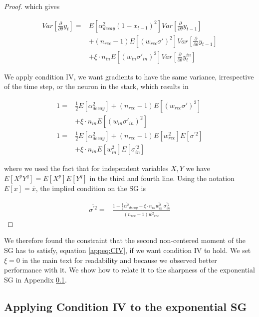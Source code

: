\begin{proof}
\noindent which gives


\begin{align}
    Var[\frac{\partial}{\partial \theta}y_t] =& E[\alpha_{decay}^2(1-x_{t-1})^2] Var[\frac{\partial}{\partial \theta}y_{t-1}] \nonumber \\&+ (n_{rec}-1)E[(w_{rec}\sigma')^2]Var[\frac{\partial}{\partial \theta}y_{t-1}] \nonumber \\&+ \xi \cdot n_{in}E[(w_{in}\sigma'_{in})^2]Var[\frac{\partial}{\partial \theta}y_{t}^{in}]
\end{align}

We apply condition IV, we want gradients to have the same variance, irrespective of the time step, or the neuron in the stack, which results in 


\begin{align}
    1=& \frac{1}{2}E[\alpha_{decay}^2]  + (n_{rec}-1)E[(w_{rec}\sigma')^2] \nonumber \\&+\xi \cdot n_{in}E[(w_{in}\sigma'_{in})^2]    \\
    1=& \frac{1}{2}E[\alpha_{decay}^2]  + (n_{rec}-1)E[w_{rec}^2]E[\sigma^{\prime 2}] \nonumber \\&+\xi \cdot n_{in}E[w_{in}^2]E[\sigma^{\prime 2}_{in}]  
\end{align}


\noindent where  we used the fact that for independent variables $X, Y$ we have $E[X^pY^q] = E[X^p]E[Y^q]$ in the third and fourth line. Using the notation $E[x]=\overline{x}$, the implied condition on the SG is 


\begin{align} 
    \overline{\sigma^{\prime 2}} =&  \frac{1-\frac{1}{2}\overline{\alpha^2}_{decay}-\xi \cdot n_{in}\overline{w_{in}^2}\ \overline{\sigma^{\prime 2}_{in}}}{(n_{rec}-1)\overline{w^2}_{rec} }  
\end{align}


\end{proof}

We therefore found the constraint that the second non-centered moment of the SG has to satisfy, equation \ref{appeq:CIV}, if we want condition IV to hold. We set $\xi=0$ in the main text for readability and because we observed better performance with it. We show how to relate it to the sharpness of the exponential SG in Appendix \ref{app:ivexp}.

\subsection{Applying Condition IV to the exponential SG}
\label{app:ivexp}

